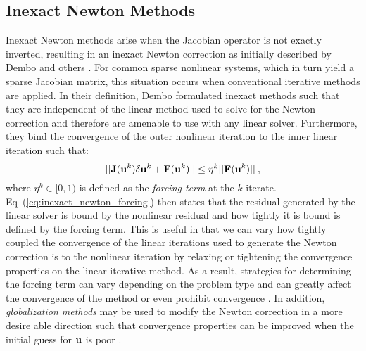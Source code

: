 \subsection{Inexact Newton Methods}
\label{subsec:newton_methods}
Inexact Newton methods arise when the Jacobian operator is not exactly
inverted, resulting in an inexact Newton correction as initially
described by Dembo and others \citep{dembo_inexact_1982}. For common
sparse nonlinear systems, which in turn yield a sparse Jacobian
matrix, this situation occurs when conventional iterative methods are
applied. In their definition, Dembo formulated inexact methods such
that they are independent of the linear method used to solve for the
Newton correction and therefore are amenable to use with any linear
solver. Furthermore, they bind the convergence of the outer nonlinear
iteration to the inner linear iteration such that:
\begin{equation}
  ||\mathbf{J}(\mathbf{u}^k)\delta \mathbf{u}^k + \mathbf{F}(\mathbf{u}^k)|| \leq \eta^k
  ||\mathbf{F}(\mathbf{u}^k)||\:,
  \label{eq:inexact_newton_forcing}
\end{equation}
where $\eta^k \in [0,1)$ is defined as the \textit{forcing term} at
  the $k$ iterate. Eq~(\ref{eq:inexact_newton_forcing}) then states
  that the residual generated by the linear solver is bound by the
  nonlinear residual and how tightly it is bound is defined by the
  forcing term. This is useful in that we can vary how tightly coupled
  the convergence of the linear iterations used to generate the Newton
  correction is to the nonlinear iteration by relaxing or tightening
  the convergence properties on the linear iterative method. As a
  result, strategies for determining the forcing term can vary
  depending on the problem type and can greatly affect the convergence
  of the method or even prohibit convergence
  \citep{eisenstat_choosing_1996}. In addition, \textit{globalization
    methods} may be used to modify the Newton correction in a more
  desire able direction such that convergence properties can be
  improved when the initial guess for $\mathbf{u}$ is poor
  \citep{pawlowski_globalization_2006}.

